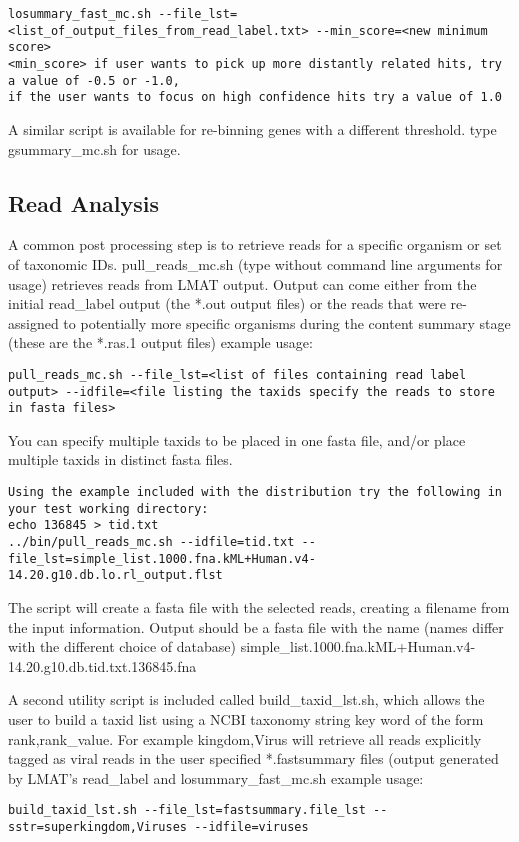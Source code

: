 \documentclass[11pt]{article}
\begin{document}
\begin{verbatim}
losummary_fast_mc.sh --file_lst=<list_of_output_files_from_read_label.txt> --min_score=<new minimum score>
<min_score> if user wants to pick up more distantly related hits, try a value of -0.5 or -1.0,
if the user wants to focus on high confidence hits try a value of 1.0
\end{verbatim}

A similar script is available for re-binning genes with a different threshold.
type gsummary_mc.sh for usage.

\subsection{Read Analysis}
A common post processing step is to retrieve reads for a specific organism or set of taxonomic IDs.
pull\_reads\_mc.sh (type without command line arguments for usage) retrieves reads from LMAT output.
Output can come either from the initial read\_label output (the *.out output files) or the reads that
were re-assigned to potentially more specific organisms during the content summary stage (these are the *.ras.1 
output files)
example usage:
\begin{verbatim}
pull_reads_mc.sh --file_lst=<list of files containing read label output> --idfile=<file listing the taxids specify the reads to store in fasta files>
\end{verbatim}
You can specify multiple taxids to be placed in one fasta file, and/or place multiple taxids in distinct fasta files. 

\begin{verbatim}
Using the example included with the distribution try the following in your test working directory:
echo 136845 > tid.txt
../bin/pull_reads_mc.sh --idfile=tid.txt --file_lst=simple_list.1000.fna.kML+Human.v4-14.20.g10.db.lo.rl_output.flst
\end{verbatim}

The script will create a fasta file with the selected reads, creating a filename from the input information. Output should be a fasta file with the name (names differ with the different choice of database)
simple_list.1000.fna.kML+Human.v4-14.20.g10.db.tid.txt.136845.fna

A second utility script is included called {build_taxid_lst.sh}, which allows the user to build a taxid list using a NCBI taxonomy string key word of the form rank,rank_value.
For example kingdom,Virus will retrieve all reads explicitly tagged as viral reads in the user specified *.fastsummary files (output generated by LMAT's {read_label} and {losummary_fast_mc.sh}
example usage:
\begin{verbatim}
build_taxid_lst.sh --file_lst=fastsummary.file_lst --sstr=superkingdom,Viruses --idfile=viruses
\end{verbatim}
\end{document}
